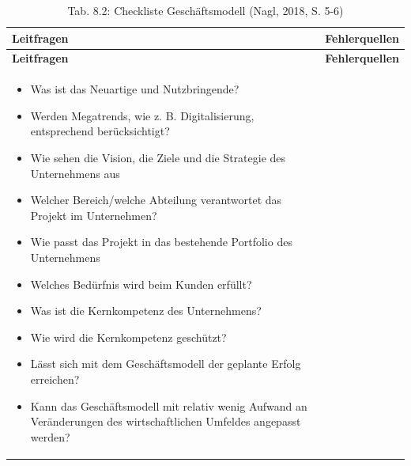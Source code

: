 \documentclass[
  letterpaper,
]{book}
\begin{document}
\begin{longtable}[]{@{}
  >{\raggedright\arraybackslash}p{}
  >{\raggedright\arraybackslash}p{}@{}}
\caption{Tab. 8.2: Checkliste Geschäftsmodell (Nagl, 2018, S.
5-6)}\tabularnewline
\toprule\noalign{}
\begin{minipage}[b]{\linewidth}\raggedright
\textbf{Leitfragen}
\end{minipage} & \begin{minipage}[b]{\linewidth}\raggedright
\textbf{Fehlerquellen}
\end{minipage} \\
\midrule\noalign{}
\endfirsthead
\toprule\noalign{}
\begin{minipage}[b]{\linewidth}\raggedright
\textbf{Leitfragen}
\end{minipage} & \begin{minipage}[b]{\linewidth}\raggedright
\textbf{Fehlerquellen}
\end{minipage} \\
\midrule\noalign{}
\endhead
\bottomrule\noalign{}
\endlastfoot
\begin{minipage}[t]{\linewidth}\raggedright
\begin{itemize}
\item
  Was ist das Neuartige und Nutzbringende?
\item
  Werden Megatrends, wie z. B. Digitalisierung, entsprechend
  berücksichtigt?
\item
  Wie sehen die Vision, die Ziele und die Strategie des Unternehmens aus
\item
  Welcher Bereich/welche Abteilung verantwortet das Projekt im
  Unternehmen?
\item
  Wie passt das Projekt in das bestehende Portfolio des Unternehmens
\item
  Welches Bedürfnis wird beim Kunden erfüllt?
\item
  Was ist die Kernkompetenz des Unternehmens?
\item
  Wie wird die Kernkompetenz geschützt?
\item
  Lässt sich mit dem Geschäftsmodell der geplante Erfolg erreichen?
\item
  Kann das Geschäftsmodell mit relativ wenig Aufwand an Veränderungen
  des wirtschaftlichen Umfeldes angepasst werden?
\end{itemize}
\end{minipage} & \begin{minipage}[t]{\linewidth}\raggedright

\end{minipage}
\end{longtable}
\end{document}
